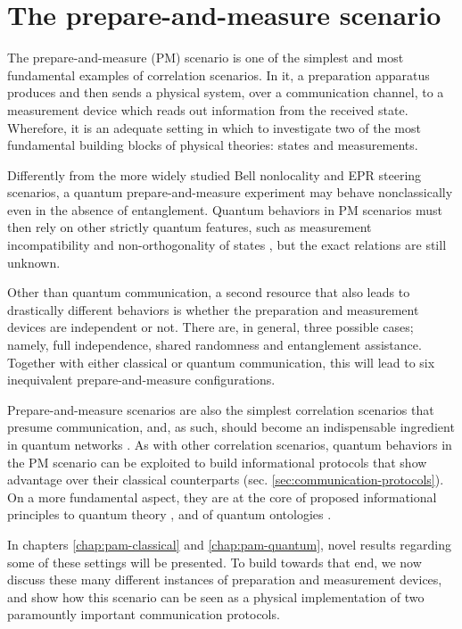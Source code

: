 \chapter{The prepare-and-measure scenario}

    The prepare-and-measure (PM) scenario is one of the simplest and most fundamental examples of correlation scenarios. In it, a preparation apparatus produces and then sends a physical system, over a communication channel, to a measurement device which reads out information from the received state. Wherefore, it is an adequate setting in which to investigate two of the most fundamental building blocks of physical theories: states and measurements.

    Differently from the more widely studied Bell nonlocality and EPR steering scenarios, a quantum prepare-and-measure experiment may behave nonclassically even in the absence of entanglement. Quantum behaviors in PM scenarios must then rely on other strictly quantum features, such as measurement incompatibility \cite{carmeli_racsincompatibility_2020} and non-orthogonality of states \cite{brunner_dimension_2013}, but the exact relations are still unknown.

    Other than quantum communication, a second resource that also leads to drastically different behaviors is whether the preparation and measurement devices are independent or not. There are, in general, three possible cases; namely, full independence, shared randomness and entanglement assistance. Together with either classical or quantum communication, this will lead to six inequivalent prepare-and-measure configurations.

    Prepare-and-measure scenarios are also the simplest correlation scenarios that presume communication, and, as such, should become an indispensable ingredient in quantum networks \cite{bowles_pamnetworks_2015,poderini_pamcriteria_2020}. As with other correlation scenarios, quantum behaviors in the PM scenario can be exploited to build informational protocols that show advantage over their classical counterparts (sec. \ref{sec:communication-protocols}). On a more fundamental aspect, they are at the core of proposed informational principles to quantum theory \cite{pawlowski_infocausality_2009,pawlowski_infocausalityreview_2011}, and of quantum ontologies \cite{spekkens_2005_contextuality}.

    In chapters \ref{chap:pam-classical} and \ref{chap:pam-quantum}, novel results regarding some of these settings will be presented. To build towards that end, we now discuss these many different instances of preparation and measurement devices, and show how this scenario can be seen as a physical implementation of two paramountly important communication protocols.

